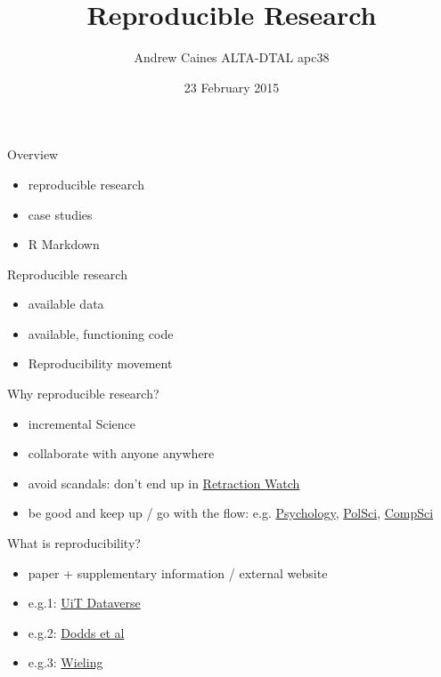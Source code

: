 \documentclass[ignorenonframetext,]{beamer}
\title{Reproducible Research}
\author{Andrew Caines \textbar{} ALTA-DTAL \textbar{} apc38}
\date{23 February 2015}
\begin{document}
\frame{\titlepage}

\begin{frame}{Overview}

\begin{itemize}[<+->]
\itemsep1pt\parskip0pt
\item
  reproducible research
\item
  case studies
\item
  R Markdown
\end{itemize}

\end{frame}

\begin{frame}{Reproducible research}

\begin{itemize}[<+->]
\itemsep1pt\parskip0pt
\item
  available data
\item
  available, functioning code
\item
  Reproducibility movement
\end{itemize}

\end{frame}

\begin{frame}{Why reproducible research?}

\begin{itemize}[<+->]
\itemsep1pt\parskip0pt
\item
  incremental Science
\item
  collaborate with anyone anywhere
\item
  avoid scandals: don't end up in
  \href{http://retractionwatch.com/}{Retraction Watch}
\item
  be good and keep up / go with the flow: e.g.
  \href{http://www.theguardian.com/science/head-quarters/2014/jan/24/the-changing-face-of-psychology}{Psychology},
  \href{http://journals.cambridge.org/action/displayIssue?jid=PSC\&volumeId=47\&seriesId=0\&issueId=01}{PolSci},
  \href{http://www.siam.org/news/news.php?id=2078}{CompSci}
\end{itemize}

\end{frame}

\begin{frame}{What is reproducibility?}

\begin{itemize}[<+->]
\itemsep1pt\parskip0pt
\item
  paper + supplementary information / external website
\item
  e.g.1:
  \href{http://opendata.uit.no/dvn/faces/study/StudyPage.xhtml?studyId=19}{UiT
  Dataverse}
\item
  e.g.2:
  \href{http://www.pnas.org/content/early/2015/02/04/1411678112}{Dodds
  et al}
\item
  e.g.3: \href{http://www.martijnwieling.nl/publications}{Wieling}
\end{itemize}

\end{frame}
\end{document}

